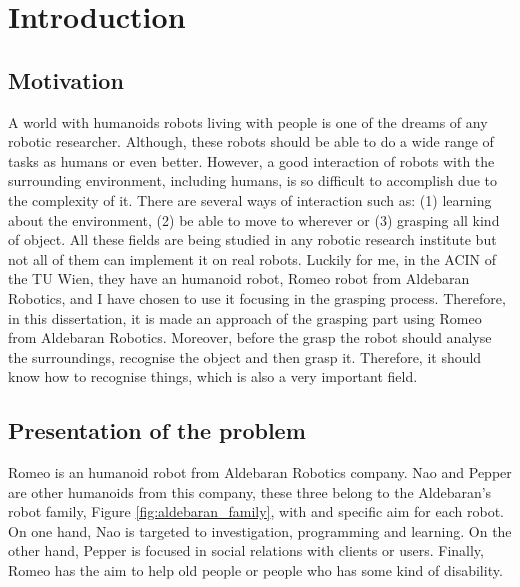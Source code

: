\documentclass[12pt,a4paper,final,twoside,openright]{report}
\begin{document}

\chapter{Introduction}

\section{Motivation}

A world with humanoids robots living with people is one of the dreams of any robotic researcher. Although, these robots should be able to do a wide range of tasks as humans or even better. However, a good interaction of robots with the surrounding environment, including humans, is so difficult to accomplish due to the complexity of it. There are several ways of interaction such as: (1) learning about the environment, (2) be able to move to wherever or (3) grasping all kind of object. All these fields are being studied in any robotic research institute but not all of them can implement it on real robots. Luckily for me, in the ACIN of the TU Wien, they have an humanoid robot, Romeo robot from Aldebaran Robotics, and I have chosen to use it focusing in the grasping process. Therefore, in this dissertation, it is made an approach of the grasping part using Romeo from Aldebaran Robotics. Moreover, before the grasp the robot should analyse the surroundings, recognise the object and then grasp it. Therefore, it should know how to recognise things, which is also a very important field.  


\section{Presentation of the problem}

Romeo is an humanoid robot from Aldebaran Robotics company. Nao and Pepper are other humanoids from this company, these three belong to the Aldebaran's robot family, Figure \ref{fig:aldebaran_family}, with and specific aim for each robot. On one hand, Nao is targeted to investigation, programming and learning. On the other hand, Pepper is focused in social relations with clients or users. Finally, Romeo has the aim to help old people or people who has some kind of disability.	
\end{document}
